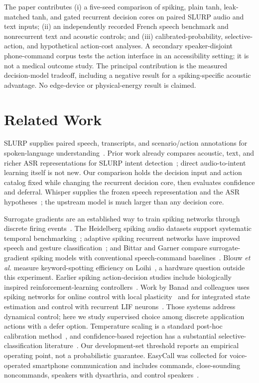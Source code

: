 \documentclass[conference]{IEEEtran}
\begin{document}
The paper contributes (i) a five-seed comparison of spiking, plain tanh, leak-matched tanh, and gated recurrent decision cores on paired SLURP audio and text inputs; (ii) an independently recorded French speech benchmark and nonrecurrent text and acoustic controls; and (iii) calibrated-probability, selective-action, and hypothetical action-cost analyses. A secondary speaker-disjoint phone-command corpus tests the action interface in an accessibility setting; it is not a medical outcome study. The principal contribution is the measured decision-model tradeoff, including a negative result for a spiking-specific acoustic advantage. No edge-device or physical-energy result is claimed.

\section{Related Work}
SLURP supplies paired speech, transcripts, and scenario/action annotations for spoken-language understanding~\cite{slurp}. Prior work already compares acoustic, text, and richer ASR representations for SLURP intent detection~\cite{representations}; direct audio-to-intent learning itself is not new. Our comparison holds the decision input and action catalog fixed while changing the recurrent decision core, then evaluates confidence and deferral. Whisper supplies the frozen speech representation and the ASR hypotheses~\cite{whisper}; the upstream model is much larger than any decision core.

Surrogate gradients are an established way to train spiking networks through discrete firing events~\cite{neftci}. The Heidelberg spiking audio datasets support systematic temporal benchmarking~\cite{cramer}; adaptive spiking recurrent networks have improved speech and gesture classification~\cite{yin}; and Bittar and Garner compare surrogate-gradient spiking models with conventional speech-command baselines~\cite{bittar}. Blouw \emph{et al.} measure keyword-spotting efficiency on Loihi~\cite{blouw}, a hardware question outside this experiment. Earlier spiking action-decision studies include biologically inspired reinforcement-learning controllers~\cite{basal}. Work by Banad and colleagues uses spiking networks for online control with local plasticity~\cite{banad_cloud} and for integrated state estimation and control with recurrent LIF neurons~\cite{banad_control}. Those systems address dynamical control; here we study supervised choice among discrete application actions with a defer option. Temperature scaling is a standard post-hoc calibration method~\cite{guo}, and confidence-based rejection has a substantial selective-classification literature~\cite{selective}. Our development-set threshold reports an empirical operating point, not a probabilistic guarantee. EasyCall was collected for voice-operated smartphone communication and includes commands, close-sounding noncommands, speakers with dysarthria, and control speakers~\cite{easycall}.
\end{document}
